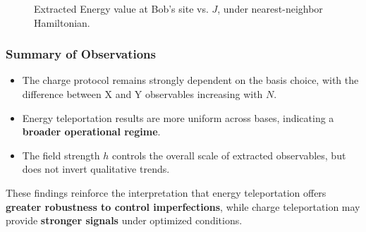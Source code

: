 \begin{figure}[t!]
    \caption{Extracted Energy value at Bob's site vs. \( J \), under nearest-neighbor Hamiltonian.}
    \label{fig:nn_vs_J}
\end{figure}

\subsubsection{Summary of Observations}

\begin{itemize}
    \item The charge protocol remains strongly dependent on the basis choice, with the difference between X and Y observables increasing with \( N \).
    \item Energy teleportation results are more uniform across bases, indicating a \textbf{broader operational regime}.
    \item The field strength \( h \) controls the overall scale of extracted observables, but does not invert qualitative trends.
\end{itemize}

These findings reinforce the interpretation that energy teleportation offers \textbf{greater robustness to control imperfections}, while charge teleportation may provide \textbf{stronger signals} under optimized conditions.
